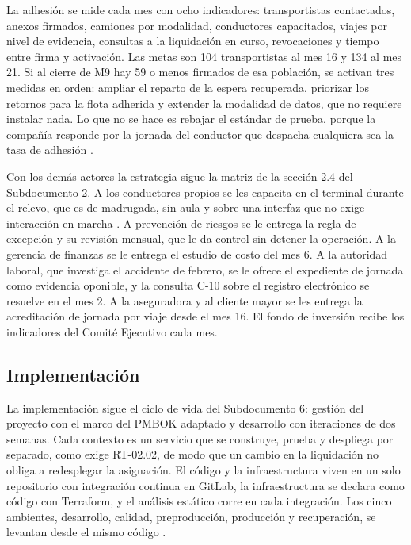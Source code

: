 La adhesión se mide cada mes con ocho indicadores: transportistas contactados, anexos firmados, camiones
por modalidad, conductores capacitados, viajes por nivel de evidencia, consultas a la liquidación en curso,
revocaciones y tiempo entre firma y activación. Las metas son 104 transportistas al mes 16 y 134 al mes 21.
Si al cierre de M9 hay 59 o menos firmados de esa población, se activan tres medidas en orden: ampliar el reparto
de la espera recuperada, priorizar los retornos para la flota adherida y extender la modalidad de datos,
que no requiere instalar nada. Lo que no se hace es rebajar el estándar de prueba, porque la compañía
responde por la jornada del conductor que despacha cualquiera sea la tasa de adhesión
.

Con los demás actores la estrategia sigue la matriz de la sección 2.4 del Subdocumento 2. A los
conductores propios se les capacita en el terminal durante el relevo, que es de madrugada, sin aula y
sobre una interfaz que no exige interacción en marcha \parencite{ley21377}. A prevención de riesgos se le
entrega la regla de excepción y su revisión mensual, que le da control sin detener la operación. A la
gerencia de finanzas se le entrega el estudio de costo del mes 6. A la autoridad laboral, que investiga el
accidente de febrero, se le ofrece el expediente de jornada como evidencia oponible, y la consulta C-10
sobre el registro electrónico se resuelve en el mes 2. A la aseguradora y al cliente mayor se les entrega
la acreditación de jornada por viaje desde el mes 16. El fondo de inversión recibe los indicadores del
Comité Ejecutivo cada mes.

\subsection{Implementación}\label{sec:3-implementacion}

La implementación sigue el ciclo de vida del Subdocumento 6: gestión del proyecto con el marco del PMBOK
adaptado y desarrollo con iteraciones de dos semanas. Cada contexto es un servicio que se construye,
prueba y despliega por separado, como exige RT-02.02, de modo que un cambio en la liquidación no obliga a
redesplegar la asignación. El código y la infraestructura viven en un solo repositorio con integración
continua en GitLab, la infraestructura se declara como código con Terraform, y el análisis estático corre
en cada integración. Los cinco ambientes, desarrollo, calidad, preproducción, producción y recuperación,
se levantan desde el mismo código .

